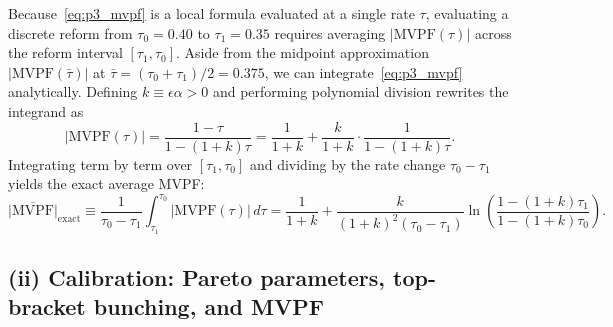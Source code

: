 Because~\eqref{eq:p3_mvpf} is a local formula evaluated at a single rate $\tau$, evaluating a discrete reform from $\tau_0 = 0.40$ to $\tau_1 = 0.35$ requires averaging $|\mathrm{MVPF}(\tau)|$ across the reform interval $[\tau_1, \tau_0]$. Aside from the midpoint approximation $|\mathrm{MVPF}(\bar{\tau})|$ at $\bar{\tau} = (\tau_0 + \tau_1)/2 = 0.375$, we can integrate~\eqref{eq:p3_mvpf} analytically. Defining $k \equiv \epsilon\alpha > 0$ and performing polynomial division rewrites the integrand as
\begin{equation}
|\mathrm{MVPF}(\tau)| = \frac{1 - \tau}{1 - (1 + k)\tau} = \frac{1}{1 + k} + \frac{k}{1 + k}\cdot\frac{1}{1 - (1 + k)\tau}.
\end{equation}
Integrating term by term over $[\tau_1, \tau_0]$ and dividing by the rate change $\tau_0 - \tau_1$ yields the exact average MVPF:
\begin{equation}
\overline{|\mathrm{MVPF}|}_{\mathrm{exact}}
\equiv \frac{1}{\tau_0 - \tau_1}\int_{\tau_1}^{\tau_0} |\mathrm{MVPF}(\tau)|\,d\tau
= \frac{1}{1 + k} + \frac{k}{(1 + k)^2(\tau_0 - \tau_1)}\ln\!\left(\frac{1 - (1 + k)\tau_1}{1 - (1 + k)\tau_0}\right).
\label{eq:p3_mvpf_exact}
\end{equation}

\subsection*{(ii) Calibration: Pareto parameters, top-bracket bunching, and MVPF}

